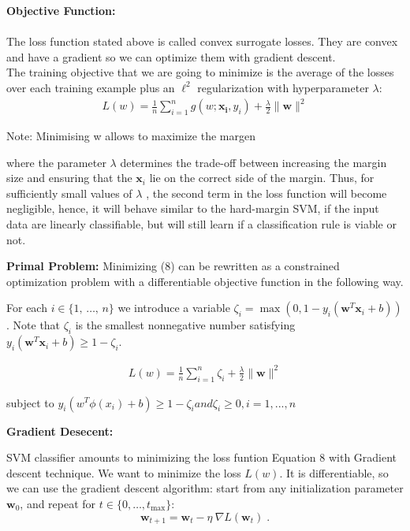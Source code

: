 \documentclass[11pt,french,english]{article}
\begin{document}
\textbf{Objective Function:}\\
 \\The loss function stated above is called convex surrogate losses. They are convex and have a gradient so we can optimize them with gradient descent.\\
 
The training objective that we are going to minimize is the average of the losses over each training example plus an $\ell^2$ regularization with hyperparameter $\lambda$:
\begin{align}
 L(w) = \frac{1}{n}\sum_{i=1}^n g(w;\mathbf{x_i}, y_i)  + \frac{\lambda}{2} \| \mathbf{w}\|^2   
\end{align}

Note:  Minimising w allows to maximize the margen

where the parameter $\lambda$  determines the trade-off between increasing the margin size and ensuring that the $\mathbf {x} _{i}$ lie on the correct side of the margin. Thus, for sufficiently small values of $\lambda$ , the second term in the loss function will become negligible, hence, it will behave similar to the hard-margin SVM, if the input data are linearly classifiable, but will still learn if a classification rule is viable or not.

\textbf{Primal Problem:}
Minimizing (8) can be rewritten as a constrained optimization problem with a differentiable objective function in the following way.

For each $ i\in \{1,\,\ldots ,\,n\}$ we introduce a variable $ \zeta _{i}=\max \left(0,1-y_{i}(\mathbf {w} ^{T}\mathbf {x} _{i}+b)\right)$. Note that $ \zeta _{i}$ is the smallest nonnegative number satisfying\\ $y_{i}(\mathbf {w} ^{T}\mathbf {x} _{i}+b)\geq 1-\zeta _{i}.$

\begin{align}
  L(w) = \frac{1}{n}\sum_{i=1}^n \zeta_i  + \frac{\lambda}{2} \| \mathbf{w}\|^2     
\end{align}

 subject to  $ y_i (w^T \phi (x_i) + b) \geq 1 - \zeta_i and  \zeta_i \geq 0, i=1, ..., n$


\textbf{Gradient Desecent:}  

SVM classifier amounts to minimizing the loss funtion Equation 8 with Gradient descent technique.
We want to minimize the loss $L(w)$. It is differentiable, so we can use the gradient descent algorithm: start from any initialization parameter $\mathbf{w}_0$, and repeat for $t\in\{0, \dots, t_\max \}$:
$$\mathbf{w}_{t+1} = \mathbf{w}_t - \eta\ \nabla L (\mathbf{w}_t) \; .$$
\end{document}
